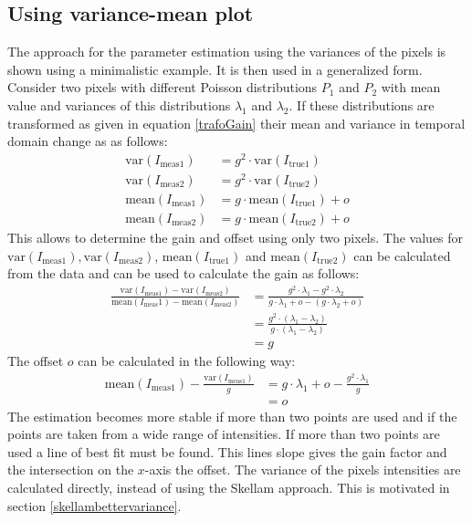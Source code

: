 \subsection{Using variance-mean plot} \label{skellam1}
The approach for the parameter estimation using the variances of the pixels is shown using a minimalistic example. It is then used in a generalized form.\newline
Consider two pixels with different Poisson distributions $P_1$ and $P_2$ with mean value and variances of this distributions $\lambda_1$ and $\lambda_2$. If these distributions are transformed as given in equation \ref{trafoGain} their mean and variance in temporal domain change as as follows:
\begin{align}
	\text{var}(I_{\text{meas}1})& = g^2\cdot\text{var}(I_{\text{true}1}) \label{calcvar}\\ 
	\text{var}(I_{\text{meas}2})& = g^2\cdot\text{var}(I_{\text{true}2})\\
	\text{mean}(I_{\text{meas}1})& = g\cdot \text{mean}(I_{\text{true}1}) + o\\
	\text{mean}(I_{\text{meas}2})& = g\cdot \text{mean}(I_{\text{true}2}) + o
\end{align}
This allows to determine the gain and offset using only two pixels.
The values for $\text{var}(I_{\text{meas}1}), \text{var}(I_{\text{meas}2})$, $\text{mean}(I_{\text{true}1})$ and $\text{mean}(I_{\text{true}2})$ can be calculated from the data and can be used to calculate the gain as follows:
\begin{align}
	\frac{\text{var}(I_{\text{meas}1})-\text{var}(I_{\text{meas}2})}{\text{mean}({I_\text{meas}1})-\text{mean}(I_{\text{meas}2})}&= \frac{g^2\cdot \lambda_1  - g^2\cdot \lambda_2 }{g\cdot \lambda_1 + o - (g\cdot \lambda_2+o)}\\
	& = \frac{g^2\cdot(\lambda_1-\lambda_2)}{g\cdot (\lambda_1-\lambda_2)}\\
	& = g
\end{align}
The offset $o$ can be calculated in the following way:
\begin{align}
	\text{mean}(I_{\text{meas}1}) - \frac{\text{var}(I_{\text{meas}1})}{g} &= g\cdot \lambda_1 + o - \frac{g^2\cdot\lambda_1}{g}\\
	&= o
\end{align}
The estimation becomes more stable if more than two points are used and if the points are taken from a wide range of intensities. If more than two points are used a line of best fit must be found. This lines slope gives the gain factor and the intersection on the $x$-axis the offset. The variance of the pixels intensities are calculated directly, instead of using the Skellam approach. This is motivated in section \ref{skellambettervariance}.
